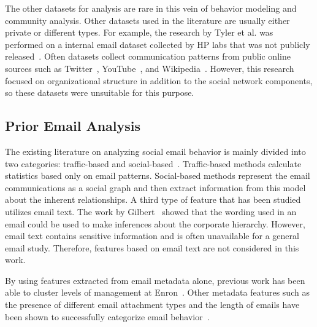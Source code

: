 \documentclass[12pt]{report}
\begin{document}
The other datasets for analysis are rare in this vein of behavior modeling and community analysis.
Other datasets used in the literature are usually either private or different types.
For example, the research by Tyler et al. was performed on a internal email dataset collected by HP labs that was not publicly released~\cite{tyler_email_2003}.
Often datasets collect communication patterns from public online sources such as Twitter~\cite{Zafarani+Liu:2009}, YouTube~\cite{mislove-2007-socialnetworks},  and Wikipedia~\cite{leskovec2010predicting}.
However, this research focused on organizational structure in addition to the social network components, so these datasets were unsuitable for this purpose.

\subsection{Prior Email Analysis} \label{sec:priorAnalysis}
The existing literature on analyzing social email behavior is mainly divided into two categories: traffic-based and social-based~\cite{tang_email_2013}.
Traffic-based methods calculate statistics based only on email patterns.
Social-based methods represent the email communications as a social graph and then extract information from this model about the inherent relationships.
A third type of feature that has been studied utilizes email text.
The work by Gilbert~\cite{gilbert_phrases_2012} showed that the wording used in an email could be used to make inferences about the corporate hierarchy.
However, email text contains sensitive information and is often unavailable for a general email study.
Therefore, features based on email text are not considered in this work.


By using features extracted from email metadata alone, previous work has been able to cluster levels of management at Enron~\cite{yelupula_social_2008}.
Other metadata features such as the presence of different email attachment types and the length of emails have been shown to successfully categorize email behavior~\cite{martin_analyzing_2005}.
\end{document}
